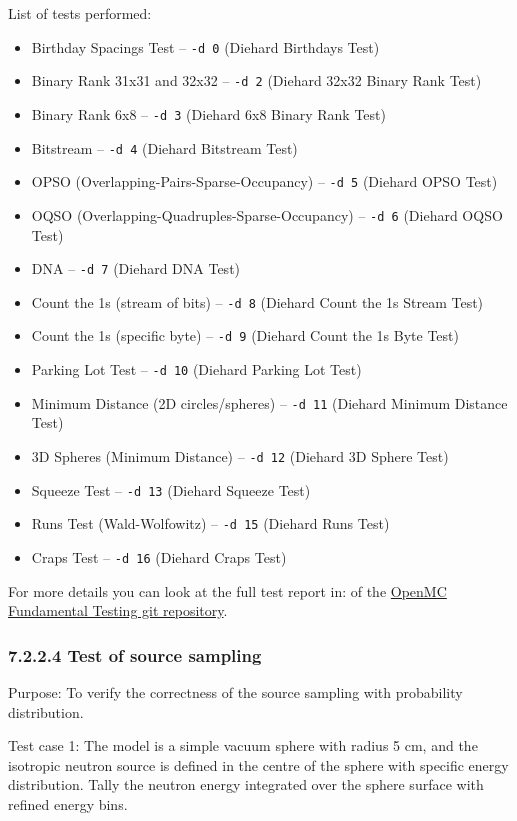 List of tests performed:
\begin{itemize} 
\item Birthday Spacings Test -- \verb|-d 0| (Diehard Birthdays Test) 
\item Binary Rank 31x31 and 32x32 -- \verb|-d 2| (Diehard 32x32 Binary Rank Test)
\item Binary Rank 6x8 -- \verb|-d 3| (Diehard 6x8 Binary Rank Test)
\item Bitstream -- \verb|-d 4| (Diehard Bitstream Test) 
\item OPSO (Overlapping-Pairs-Sparse-Occupancy) -- \verb|-d 5| (Diehard OPSO Test) 
\item OQSO (Overlapping-Quadruples-Sparse-Occupancy) -- \verb|-d 6| (Diehard OQSO Test) 
\item DNA -- \verb|-d 7| (Diehard DNA Test) 
\item Count the 1s (stream of bits) -- \verb|-d 8| (Diehard Count the 1s Stream Test) 
\item Count the 1s (specific byte) -- \verb|-d 9| (Diehard Count the 1s Byte Test) 
\item Parking Lot Test -- \verb|-d 10| (Diehard Parking Lot Test) 
\item Minimum Distance (2D circles/spheres) -- \verb|-d 11| (Diehard Minimum Distance Test) 
\item 3D Spheres (Minimum Distance) -- \verb|-d 12| (Diehard 3D Sphere Test) 
\item Squeeze Test -- \verb|-d 13| (Diehard Squeeze Test) 
\item Runs Test (Wald-Wolfowitz) -- \verb|-d 15| (Diehard Runs Test) 
\item Craps Test -- \verb|-d 16| (Diehard Craps Test) 
\end{itemize}

For more details you can look at the full test report in:  of the
\href{https://github.com/seehuhn/dieharder}{OpenMC Fundamental Testing git repository}.

\subsubsection{7.2.2.4 Test of source sampling}
Purpose: To verify the correctness of the source sampling with probability distribution.

Test case 1: The model is a simple vacuum sphere with radius 5 cm, and the isotropic
neutron source is defined in the centre of the sphere with specific energy distribution.
Tally the neutron energy integrated over the sphere surface with refined energy bins.


